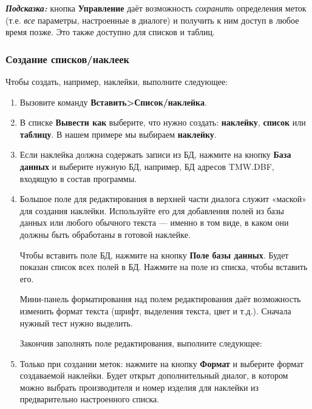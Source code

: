 ﻿\documentclass[a4paper,10pt]{article}
\begin{document}
\begin{mdframed}[backgroundcolor=blue!10]
\textbf{\textit{Подсказка:}} кнопка \textbf{Управление}  даёт возможность \textit{сохранить} определения меток (т.е. \textit{все} параметры, настроенные в диалоге) и получить к ним доступ в любое время позже. Это также доступно для списков и таблиц.
\end{mdframed}

\subsubsection{Создание списков/наклеек}
Чтобы создать, например, наклейки, выполните следующее:

\begin{enumerate}
 \item Вызовите команду \textbf{Вставить>Список/наклейка}.
 \item В списке \textbf{Вывести как} выберите, что нужно создать: \textbf{наклейку}, \textbf{список} или \textbf{таблицу}. В нашем примере мы выбираем \textbf{наклейку}.
 \item Если наклейка должна содержать записи из БД, нажмите на кнопку \textbf{База данных} и выберите нужную БД, например, БД адресов TMW.DBF, входящую в состав программы.
 \item Большое поле для редактирования в верхней части диалога служит «маской» для создания наклейки. Используйте его для добавления полей из базы данных или любого обычного текста — именно в том виде, в каком они должны быть обработаны в готовой наклейке.
 
 Чтобы вставить поле БД, нажмите на кнопку \textbf{Поле базы данных}. Будет показан список всех полей в БД. Нажмите на поле из списка, чтобы вставить его.
 
 Мини-панель форматирования над полем редактирования даёт возможность изменить формат текста (шрифт, выделения текста, цвет и т.д.). Сначала нужный тест нужно выделить.
 
 Закончив заполнять поле редактирования, выполните следующее:
 
 \item Только при создании меток: нажмите на кнопку \textbf{Формат} и выберите формат создаваемой наклейки. Будет открыт дополнительный диалог, в котором можно выбрать производителя и номер изделия для наклейки из предварительно настроенного списка.
 

\end{enumerate}
\end{document}
